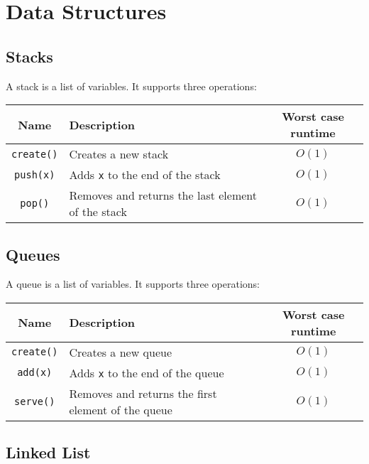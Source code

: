 \section{Data Structures}

\subsection{Stacks}

A stack is a list of variables. It supports three operations:

\begin{center}
  \begin{tabular}{ || c | p{6.5cm} | c || }
    \hline
    Name & Description & Worst case runtime \\
    \hline
    \texttt{create()} & Creates a new stack & $O(1)$ \\
    \hline
    \texttt{push(x)} & Adds \texttt{x} to the end of the stack & $O(1)$ \\
    \hline
    \texttt{pop()} & Removes and returns the last element of the stack & $O(1)$ \\
    \hline
  \end{tabular}
\end{center}

\subsection{Queues}

A queue is a list of variables. It supports three operations:

\begin{center}
  \begin{tabular}{ || c | p{6.5cm} | c || }
    \hline
    Name & Description & Worst case runtime \\
    \hline
    \texttt{create()} & Creates a new queue & $O(1)$ \\
    \hline
    \texttt{add(x)} & Adds \texttt{x} to the end of the queue & $O(1)$ \\
    \hline
    \texttt{serve()} & Removes and returns the first element of the queue & $O(1)$ \\
    \hline
  \end{tabular}
\end{center}

\subsection{Linked List}

